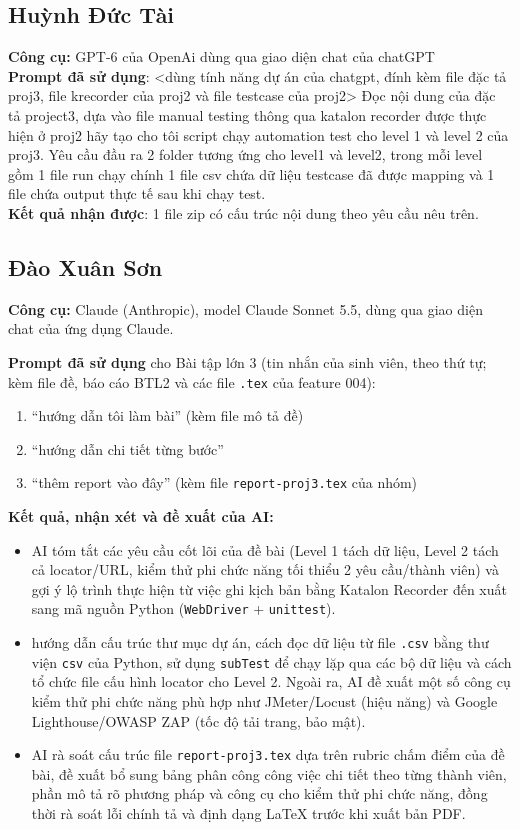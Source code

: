 \documentclass[12pt,a4paper]{article}
\begin{document}
\subsection{Huỳnh Đức Tài}
\textbf{Công cụ:} GPT-6 của OpenAi dùng qua giao diện chat của chatGPT\\
\textbf{Prompt đã sử dụng}: <dùng tính năng dự án của chatgpt, đính kèm file đặc tả proj3, file krecorder của proj2 và file testcase của proj2> Đọc nội dung của đặc tả project3, dựa vào file manual testing thông qua katalon recorder được thực hiện ở proj2 hãy tạo cho tôi script chạy automation test cho level 1 và level 2 của proj3. Yêu cầu đầu ra 2 folder tương ứng cho level1 và level2, trong mỗi level gồm 1 file run chạy chính 1 file csv chứa dữ liệu testcase đã được mapping và 1 file chứa output thực tế sau khi chạy test.\\
\textbf{Kết quả nhận được}: 1 file zip có cấu trúc nội dung theo yêu cầu nêu trên.\\
\subsection{Đào Xuân Sơn}
\textbf{Công cụ:} Claude (Anthropic), model Claude Sonnet 5.5, dùng qua giao diện chat của ứng dụng Claude.

\noindent\textbf{Prompt đã sử dụng} cho Bài tập lớn 3 (tin nhắn của sinh viên, theo thứ tự; kèm file đề, báo cáo BTL2 và các file \texttt{.tex} của feature 004):
\begin{enumerate}[noitemsep]
  \item ``hướng dẫn tôi làm bài'' (kèm file mô tả đề)
  \item ``hướng dẫn chi tiết từng bước''
  \item ``thêm report vào đây'' (kèm file \texttt{report-proj3.tex} của nhóm)
\end{enumerate}

\noindent\textbf{Kết quả, nhận xét và đề xuất của AI:}
\begin{itemize}[noitemsep]
  \item AI tóm tắt các yêu cầu cốt lõi của đề bài (Level 1 tách dữ liệu, Level 2 tách cả locator/URL, kiểm thử phi chức năng tối thiểu 2 yêu cầu/thành viên) và gợi ý lộ trình thực hiện từ việc ghi kịch bản bằng Katalon Recorder đến xuất sang mã nguồn Python (\texttt{WebDriver} + \texttt{unittest}).
  \item hướng dẫn cấu trúc thư mục dự án, cách đọc dữ liệu từ file \texttt{.csv} bằng thư viện \texttt{csv} của Python, sử dụng \texttt{subTest} để chạy lặp qua các bộ dữ liệu và cách tổ chức file cấu hình locator cho Level 2. Ngoài ra, AI đề xuất một số công cụ kiểm thử phi chức năng phù hợp như JMeter/Locust (hiệu năng) và Google Lighthouse/OWASP ZAP (tốc độ tải trang, bảo mật).
  \item AI rà soát cấu trúc file \texttt{report-proj3.tex} dựa trên rubric chấm điểm của đề bài, đề xuất bổ sung bảng phân công công việc chi tiết theo từng thành viên, phần mô tả rõ phương pháp và công cụ cho kiểm thử phi chức năng, đồng thời rà soát lỗi chính tả và định dạng LaTeX trước khi xuất bản PDF.
\end{itemize}
\end{document}
